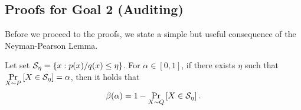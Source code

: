 \subsection{Proofs for Goal 2 (Auditing)}
Before we proceed to the proofs, we state a simple but useful consequence of the Neyman-Pearson Lemma.
\begin{cor}
   \label{corollary: NP lemma}
    Let set $\mathcal{S}_{\eta} = \{x: p(x)/q(x) \leq \eta \}$.
    For $\alpha \in [0,1]$, if there exists $\eta$ such that $\Pr\limits_{X \sim P}\left[ X \in \mathcal{S}_{\eta} \right] = \alpha$, then it holds that
    \begin{align*}
    \beta(\alpha) = 1 - \Pr\limits_{X \sim Q}\left[ X \in \mathcal{S}_{\eta} \right].
    \end{align*}
\end{cor}

